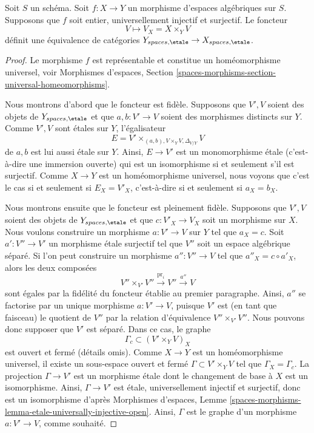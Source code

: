 \begin{theorem}
\label{theorem-topological-invariance}
Soit $S$ un schéma.
Soit $f : X \to Y$ un morphisme d'espaces algébriques sur $S$.
Supposons que $f$ soit entier, universellement injectif et surjectif.
Le foncteur
$$
V \longmapsto V_X = X \times_Y V
$$
définit une équivalence de catégories
$Y_{spaces, \etale} \to X_{spaces, \etale}$.
\end{theorem}

\begin{proof}
Le morphisme $f$ est représentable et constitue un homéomorphisme universel, voir
Morphismes d'espaces,
Section \ref{spaces-morphisms-section-universal-homeomorphisms}.

\medskip\noindent
Nous montrons d'abord que le foncteur est fidèle.
Supposons que $V', V$ soient des objets de $Y_{spaces, \etale}$ et
que $a, b : V' \to V$ soient des morphismes distincts sur $Y$.
Comme $V', V$ sont étales sur $Y$, l'égalisateur
$$
E =  V' \times_{(a, b), V \times_Y V, \Delta_{V/Y}} V
$$
de $a, b$ est lui aussi étale sur $Y$. Ainsi, $E \to V'$ est un monomorphisme étale
(c'est-à-dire une immersion ouverte) qui est un isomorphisme si et seulement s'il est
surjectif. Comme $X \to Y$ est un homéomorphisme universel, nous voyons que c'est
le cas si et seulement si $E_X = V'_X$, c'est-à-dire si et seulement si $a_X = b_X$.

\medskip\noindent
Nous montrons ensuite que le foncteur est pleinement fidèle.
Supposons que $V', V$ soient des objets de $Y_{spaces, \etale}$ et
que $c : V'_X \to V_X$ soit un morphisme sur $X$. Nous voulons construire
un morphisme $a : V' \to V$ sur $Y$ tel que $a_X = c$.
Soit $a' : V'' \to V'$ un morphisme étale surjectif tel que $V''$ soit
un espace algébrique séparé. Si l'on peut construire un morphisme
$a'' : V'' \to V$ tel que $a''_X = c \circ a'_X$, alors les deux composées
$$
V'' \times_{V'} V'' \xrightarrow{\text{pr}_i} V'' \xrightarrow{a''} V
$$
sont égales par la fidélité du foncteur établie au premier
paragraphe. Ainsi, $a''$ se factorise par un unique morphisme
$a : V' \to V$, puisque $V'$ est (en tant que faisceau) le quotient de $V''$ par
la relation d'équivalence $V'' \times_{V'} V''$. Nous pouvons donc supposer que
$V'$ est séparé. Dans ce cas, le graphe
$$
\Gamma_c \subset (V' \times_Y V)_X
$$
est ouvert et fermé (détails omis). Comme $X \to Y$ est un homéomorphisme
universel, il existe un sous-espace ouvert et fermé
$\Gamma \subset V' \times_Y V$ tel que $\Gamma_X = \Gamma_c$.
La projection $\Gamma \to V'$ est un morphisme étale dont le changement
de base à $X$ est un isomorphisme. Ainsi, $\Gamma \to V'$ est étale,
universellement injectif et surjectif, donc est un isomorphisme d'après
Morphismes d'espaces,
Lemme \ref{spaces-morphisms-lemma-etale-universally-injective-open}.
Ainsi, $\Gamma$ est le graphe d'un morphisme $a : V' \to V$, comme souhaité.


\end{proof}
